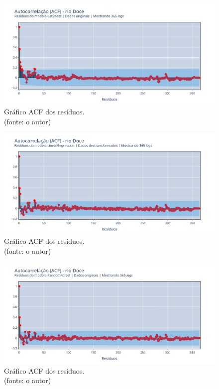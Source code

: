 \begin{figure}[!h]
	\centering
	\includegraphics[scale=0.33]{Figuras/rio_doce/wfv/CB/CB_WFV_ORIG_RESID_ACF.png}
	\caption{Gráfico ACF dos resíduos.\\(fonte: o autor)}
	\label{fig:doce_CB_WFV_ORIG_RESID_ACF}
\end{figure}

\begin{figure}[!h]
	\centering
	\includegraphics[scale=0.33]{Figuras/rio_doce/wfv/LR/LR_WFV_LOG_RESID_ACF.png}
	\caption{Gráfico ACF dos resíduos.\\(fonte: o autor)}
	\label{fig:doce_LR_WFV_LOG_RESID_ACF}
\end{figure}

\begin{figure}[!h]
	\centering
	\includegraphics[scale=0.33]{Figuras/rio_doce/wfv/RF/RF_WFV_ORIG_RESID_ACF.png}
	\caption{Gráfico ACF dos resíduos.\\(fonte: o autor)}
	\label{fig:doce_RF_WFV_ORIG_RESID_ACF}
\end{figure}

